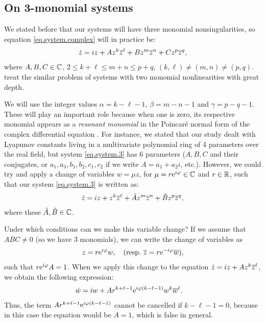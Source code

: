 \subsection{On 3-monomial systems}
\label{sec.3mono.resonant}

We stated before that our systems will have three monomial nonsingularities, so equation \eqref{eq.system.complex} will in practice be:
\begin{align}
\dot z = iz + Az^k\overline{z}^\ell+Bz^m\overline{z}^n+Cz^p\overline{z}^q,
\label{eq.system.3}
\end{align}
where $A,B,C\in\mathbb{C}$, $2\le k+\ell\le m+n\le p+q$, $(k,\ell)\ne(m,n)\ne(p,q)$. \textcite{Gasull2016} treat the similar problem of systems with two monomial nonlinearities with great depth.

We will use the integer values $\alpha=k-\ell-1$, $\beta=m-n-1$ and $\gamma=p-q-1$. These will play an important role because when one is zero, its respective monomial appears as a \emph{resonant monomial} in the Poincaré normal form of the complex differential equation \parencite{Gasull2016}. For instance, we stated that our study dealt with Lyapunov constants living in a multivariate polynomial ring of 4 parameters over the real field, but system \eqref{eq.system.3} has 6 parameters ($A,B,C$ and their conjugates, or $a_1,a_3,b_1,b_2,c_1,c_2$ if we write $A=a_1+a_2i$, etc.). However, we could try and apply a change of variables $w=\mu z$, for $\mu=r\mathrm{e}^{i \varphi}\in\mathbb{C}$ and $r\in\mathbb{R}$, such that our system \eqref{eq.system.3} is written as:
\begin{align}
\dot z = iz + z^k\overline{z}^\ell+\tilde Az^m\overline{z}^n+\tilde Bz^p\overline{z}^q,
\label{eq.system.3.4p}
\end{align}
where these $\tilde A,\tilde B\in\mathbb{C}$.

Under which conditions can we make this variable change? If we assume that $ABC\ne0$ (so we have 3 monomials), we can write the change of variables as
\begin{align*}
z=r\mathrm{e}^{i \varphi}w,\quad(\mathrm{resp.}~\overline{z}=r\mathrm{e}^{-i \varphi}\overline w),
\end{align*}
such that $r\mathrm{e}^{i \varphi}A=1$. When we apply this change to the equation $\dot z=iz+Az^k\overline{z}^\ell$, we obtain the following expression:
\begin{align*}
\dot w &= iw+Ar^{k+\ell-1}\mathrm{e}^{i \varphi (k-\ell-1)}w^k\overline w^\ell.
\end{align*}
Thus, the term $Ar^{k+\ell-1}\mathrm{e}^{i \varphi(k-\ell-1)}$ cannot be cancelled if $k-\ell-1=0$, because in this case the equation would be $A=1$, which is false in general.

